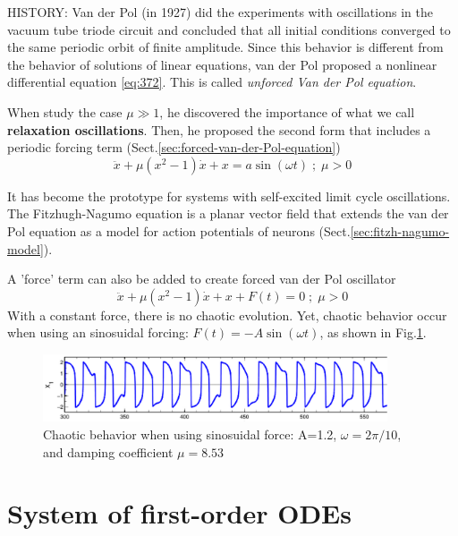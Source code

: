 \begin{mdframed}

HISTORY: Van der Pol (in 1927) did the experiments with oscillations in the
vacuum tube triode circuit and concluded that all initial conditions converged
to the same periodic orbit of finite amplitude.
Since this behavior is different from the behavior of solutions of linear 
equations, van der Pol proposed a nonlinear differential equation \ref{eq:372}.
This is called {\it unforced Van der Pol equation}.

When study the case $\mu \gg 1$, he discovered the importance of what we call
{\bf relaxation oscillations}. Then, he proposed the second form that includes a
periodic forcing term (Sect.\ref{sec:forced-van-der-Pol-equation})
\begin{equation}
\ddot{x} + \mu (x^2-1) \dot{x} + x = a \sin(\omega t)\; ; \; \mu>0
\end{equation}

It has become the prototype for systems with self-excited limit cycle
oscillations. The Fitzhugh-Nagumo equation is a planar vector field that extends
the van der Pol equation as a model for action potentials of neurons
(Sect.\ref{sec:fitzh-nagumo-model}).

\end{mdframed}

A 'force' term can also be added to create forced van der Pol oscillator
\begin{equation}
  \ddot{x} + \mu (x^2-1) \dot{x} + x + F(t) = 0\; ; \; \mu>0
\end{equation}
With a constant force, there is no chaotic evolution. Yet, chaotic behavior
occur when using an sinosuidal forcing: $F(t)=-A\sin(\omega t)$, as shown in
Fig.\ref{fig:vanderPol_sinosuidalforce}.

\begin{figure}[hbt]
  \centerline{\includegraphics[height=2cm,
    angle=0]{./images/vanderPol_sinosuidalforce.eps}}
  \caption{Chaotic behavior when using sinosuidal force: A=1.2,
  $\omega=2\pi/10$, and damping coefficient $\mu=8.53$}
  \label{fig:vanderPol_sinosuidalforce}
\end{figure}


\section{System of first-order ODEs}
\label{sec:linear-system}

